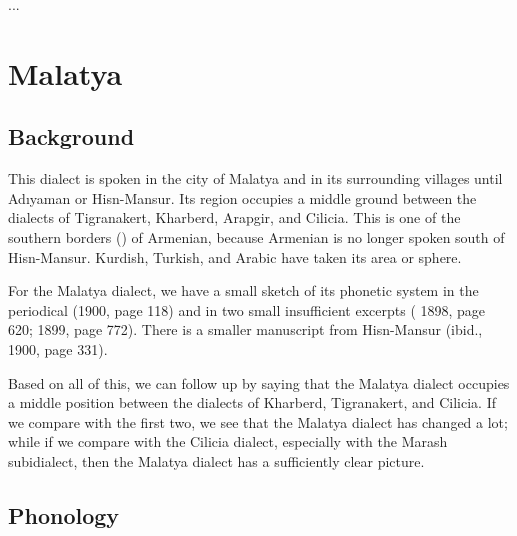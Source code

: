 ...




\chapter{Malatya} \label{chapter:Malatya}
\section{Background}
\begin{adjarianpage}\label{page:196}\end{adjarianpage}%


This dialect is spoken in the city of Malatya and in its surrounding villages until Adıyaman or Hisn-Mansur. Its region occupies a middle ground between the dialects of Tigranakert, Kharberd, Arapgir, and Cilicia. This is one of the southern borders () of Armenian, because Armenian is no longer spoken south of Hisn-Mansur. Kurdish, Turkish, and Arabic have taken its area or sphere. 

For the Malatya dialect, we have a small sketch of its phonetic system in the periodical  (1900, page 118) and in two small insufficient excerpts ( 1898, page 620; 1899, page 772). There is a smaller manuscript from Hisn-Mansur (ibid., 1900, page 331).

Based on all of this, we can follow up by saying that the Malatya dialect occupies a middle position between the dialects of Kharberd, Tigranakert, and Cilicia. If we compare with the first two, we see that the Malatya dialect has changed a lot; while if we compare with the Cilicia dialect, especially with the Marash subidialect, then the Malatya dialect has a sufficiently clear picture. 


\section{Phonology}
